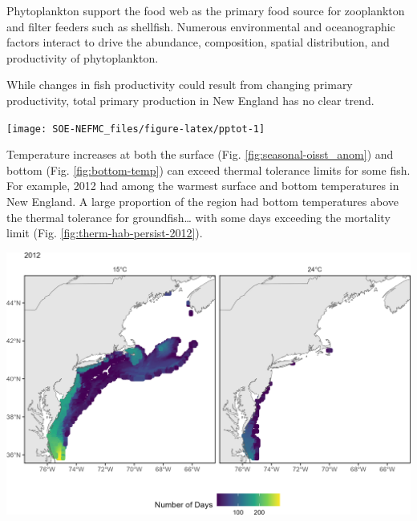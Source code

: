 \documentclass[
  10pt,
]{article}
\begin{document}
Phytoplankton support the food web as the primary food source for zooplankton and filter feeders such as shellfish. Numerous environmental and oceanographic factors interact to drive the abundance, composition, spatial distribution, and productivity of phytoplankton.

While changes in fish productivity could result from changing primary productivity, total primary production in New England has no clear trend.

\begin{center}\texttt{[image: SOE-NEFMC\_files/figure-latex/pptot-1]} \end{center}

Temperature increases at both the surface (Fig. \ref{fig:seasonal-oisst_anom}) and bottom (Fig. \ref{fig:bottom-temp}) can exceed thermal tolerance limits for some fish. For example, 2012 had among the warmest surface and bottom temperatures in New England. A large proportion of the region had bottom temperatures above the thermal tolerance for groundfish\ldots{} with some days exceeding the mortality limit (Fig. \ref{fig:therm-hab-persist-2012}).

\begin{center}\includegraphics{SOE-NEFMC_files/figure-latex/therm-hab-persist-2012-1} \end{center}
\end{document}
